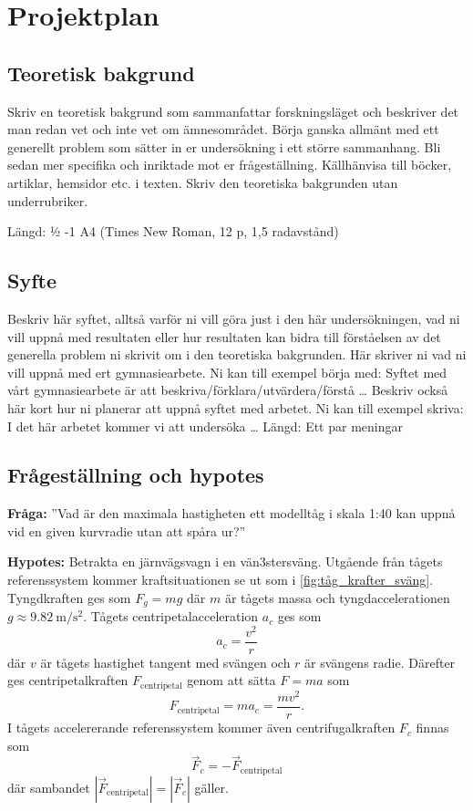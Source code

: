 \section{Projektplan}
\subsection{Teoretisk bakgrund}
Skriv en teoretisk bakgrund som sammanfattar forskningsläget och beskriver det man redan vet och inte vet om ämnesområdet. Börja ganska allmänt med ett generellt problem som sätter in er undersökning i ett större sammanhang. Bli sedan mer specifika och inriktade mot er frågeställning. Källhänvisa till böcker, artiklar, hemsidor etc. i texten. Skriv den teoretiska bakgrunden utan underrubriker.

Längd: ½ -1 A4 (Times New Roman, 12 p, 1,5 radavstånd)

\subsection{Syfte}
Beskriv här syftet, alltså varför ni vill göra just i den här undersökningen, vad ni vill uppnå med resultaten eller hur resultaten kan bidra till förståelsen av det generella problem ni skrivit om i den teoretiska bakgrunden. Här skriver ni vad ni vill uppnå med ert gymnasiearbete. Ni kan till exempel börja med: Syftet med vårt gymnasiearbete är att beskriva/förklara/utvärdera/förstå … Beskriv också här kort hur ni planerar att uppnå syftet med arbetet. Ni kan till exempel skriva: I det här arbetet kommer vi att undersöka …
Längd: Ett par meningar

\subsection{Frågeställning och hypotes}
\textbf{Fråga:} ''Vad är den maximala hastigheten ett modelltåg i skala 1:40 kan uppnå vid en given kurvradie utan att spåra ur?''

\textbf{Hypotes:} Betrakta en järnvägsvagn i en vän3stersväng. Utgående från tågets referenssystem kommer kraftsituationen se ut som i \cref{fig:tåg_krafter_sväng}. Tyngdkraften ges som $F_g = mg$ där $m$ är tågets massa och tyngdaccelerationen $g\approx \SI{9.82}{\m\per\s\squared}$. Tågets centripetalacceleration $a_c$ ges som
\begin{equation}
        a_c = \frac{v^2}{r}
\end{equation}
 där $v$ är tågets hastighet tangent med svängen och $r$ är svängens radie. Därefter ges centripetalkraften $F_\mathrm{centripetal}$ genom att sätta $F = ma$ som
 \begin{equation}
    F_\mathrm{centripetal} = ma_c = \frac{mv^2}{r}.
 \end{equation}
 I tågets accelererande referenssystem kommer även centrifugalkraften $F_c$ finnas som
 \begin{equation}
    \vec F_c = -\vec F_\mathrm{centripetal}
 \end{equation}
 där sambandet $|\vec F_\mathrm{centripetal}| = |\vec F_c|$ gäller.

